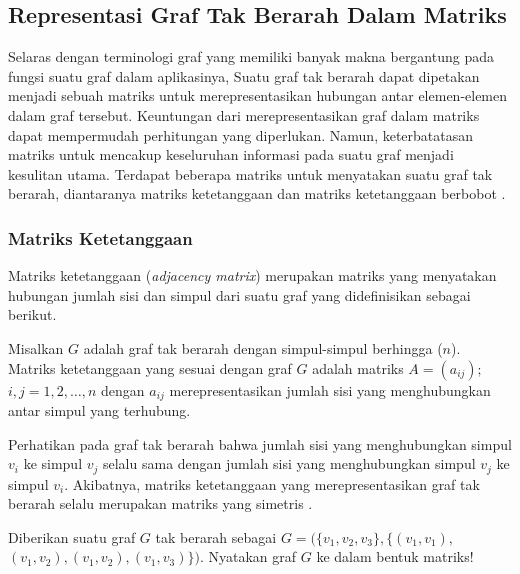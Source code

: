 {    %
    \vspace{-5mm}
    \subsection{Representasi Graf Tak Berarah Dalam Matriks}
    {\frenchspacing
        Selaras dengan terminologi graf yang memiliki banyak makna bergantung pada fungsi suatu graf dalam aplikasinya,
        Suatu graf tak berarah dapat dipetakan menjadi sebuah matriks untuk merepresentasikan hubungan antar elemen-elemen dalam graf tersebut.
        Keuntungan dari merepresentasikan graf dalam matriks dapat mempermudah perhitungan yang diperlukan.
        Namun, keterbatatasan matriks untuk mencakup keseluruhan informasi pada suatu graf menjadi kesulitan utama.
        Terdapat beberapa matriks untuk menyatakan suatu graf tak berarah, diantaranya matriks ketetanggaan dan matriks ketetanggaan berbobot .

        \vspace{-5mm}
        \subsubsection{Matriks Ketetanggaan}
        {\frenchspacing
            Matriks ketetanggaan (\textit{adjacency matrix}) merupakan matriks yang menyatakan hubungan jumlah sisi dan simpul dari suatu graf yang didefinisikan sebagai berikut.

            \begin{definisi}
                \label{def:Matriks ketetanggaan}
                Misalkan $G$ adalah graf tak berarah dengan simpul-simpul berhingga ($n$).
                Matriks ketetanggaan yang sesuai dengan graf $G$ adalah matriks $A=(a_{ij});$ $i,j=1,2,\dots,n$ dengan $a_{ij}$ merepresentasikan jumlah sisi yang menghubungkan antar simpul yang terhubung.
            \end{definisi}

            \noindent
            Perhatikan pada graf tak berarah bahwa jumlah sisi yang menghubungkan simpul $v_{i}$ ke simpul $v_{j}$ selalu sama
            dengan jumlah sisi yang menghubungkan simpul $v_{j}$ ke simpul $v_{i}$.
            Akibatnya, matriks ketetanggaan yang merepresentasikan graf tak berarah selalu merupakan matriks yang simetris .

            \begin{contoh}
                \label{con:Matriks ketetanggaan}
                Diberikan suatu graf $G$ tak berarah sebagai $G=(\{v_{1},v_{2},v_{3}\},\{(v_{1},v_{1}),$ $(v_{1},v_{2}),(v_{1},v_{2}),(v_{1},v_{3})\})$.
                Nyatakan graf $G$ ke dalam bentuk matriks!


\end{contoh}}}}
